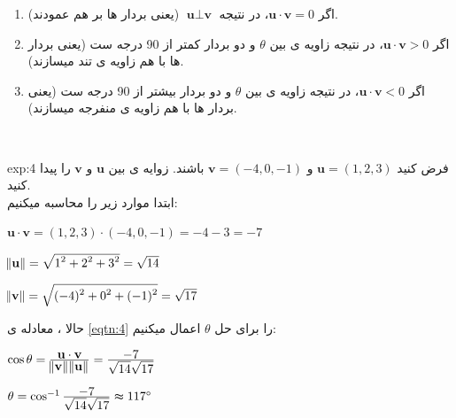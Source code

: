 {\begin{spacing}{1.5}
        \begin{enumerate}[label=\textbf{\arabic*}.]
            \item {اگر $\textbf{u}\cdot\textbf{v}=0$، در نتیجه $\textbf{u}\perp\textbf{v}$ (یعنی بردار ها بر هم عمودند).}
            \item {اگر $\textbf{u}\cdot\textbf{v}>0$، در نتیجه زاویه ی بین $\theta$ و دو بردار کمتر از 90 درجه ست (یعنی بردار ها با هم زاویه ی تند میسازند).}
            \item {اگر $\textbf{u}\cdot\textbf{v}<0$، در نتیجه زاویه ی بین $\theta$ و دو بردار بیشتر از 90 درجه ست (یعنی بردار ها با هم زاویه ی منفرجه میسازند).}
        \end{enumerate} \\

        \begin{example}{exp:4}
            فرض کنید $\textbf{u}=(1,2,3)$ و $\textbf{v}=(-4,0,-1)$ باشند. زوایه ی بین $\textbf{u}$ و $\textbf{v}$ را پیدا کنید. \\
            ابتدا موارد زیر را محاسبه میکنیم:

            \begin{center}
                $\textbf{u}\cdot\textbf{v}=(1,2,3)\cdot(-4,0,-1)=-4-3=-7$

                $\norm{\textbf{u}}=\sqrt{\displaystyle 1^2+2^2+3^2}=\sqrt{\displaystyle 14}$

                $\norm{\textbf{v}}=\sqrt{\displaystyle (-4)^2+0^2+(-1)^2}=\sqrt{\displaystyle 17}$
            \end{center}

            حالا ، معادله ی \ref{eqtn:4} را برای حل $\theta$ اعمال میکنیم:

            \begin{center}
                $\cos\theta=\frac{\displaystyle\textbf{u}\cdot\textbf{v}}{\displaystyle\norm{\textbf{v}}\norm{\textbf{u}}}=\frac{\displaystyle -7}{\displaystyle \sqrt{\displaystyle 14}\sqrt{\displaystyle 17}}$

                $\theta=\cos^{-1}\frac{\displaystyle -7}{\displaystyle \sqrt{\displaystyle 14}\sqrt{\displaystyle 17}}\thickapprox 117^\circ$
            \end{center}
        \end{example}


\end{spacing}}
